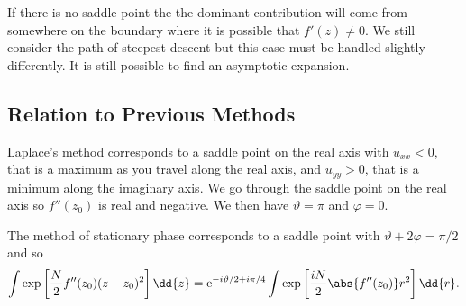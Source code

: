 \documentclass[fleqn]{NotesClass}
\newcommand*{\e}{\mathrm{e}}
\begin{document}
    If there is no saddle point the the dominant contribution will come from somewhere on the boundary where it is possible that \(f'(z) \ne 0\).
    We still consider the path of steepest descent but this case must be handled slightly differently.
    It is still possible to find an asymptotic expansion.
    
    
    \subsection{Relation to Previous Methods}
    Laplace's method corresponds to a saddle point on the real axis with \(u_{xx} < 0\), that is a maximum as you travel along the real axis, and \(u_{yy} > 0\), that is a minimum along the imaginary axis.
    We go through the saddle point on the real axis so \(f''(z_0)\) is real and negative.
    We then have \(\vartheta = \pi\) and \(\varphi = 0\).
    
    The method of stationary phase corresponds to a saddle point with \(\vartheta + 2\varphi = \pi/2\) and so
    \begin{equation}
        \int \exp\left[ \frac{N}{2}f''(z_0)(z - z_0)^2 \right] \dd{z} = \e^{-i\vartheta/2 + i\pi/4} \int \exp\left[ \frac{iN}{2}\abs{f''(z_0)}r^2 \right]\dd{r}.
    \end{equation}
    
\end{document}
